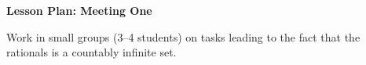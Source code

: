 \documentclass[12pt]{amsart}
\theoremstyle{definition}
\begin{document}
\begin{center}
\textbf{\Huge
Lesson Plan: Meeting One
}
\end{center}
\vspace{.5in}

Work in small groups (3--4 students) on tasks leading to the fact that the rationals is a countably infinite set.
\end{document}
